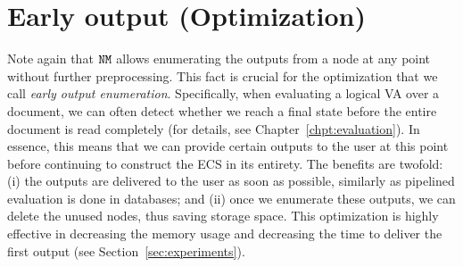 \section{Early output (Optimization)} 

Note again that $\mathtt{NM}$ allows enumerating the outputs from a node at any point without further preprocessing. This fact is crucial for the optimization that we call \emph{early output enumeration}. Specifically, when evaluating a logical VA over a document, we can often detect whether we reach a final state before the entire document is read completely (for details, see Chapter~\ref{chpt:evaluation}). In essence, this means that we can provide certain outputs to the user at this point before continuing to construct the ECS in its entirety. The benefits are twofold: (i) the outputs are delivered to the user as soon as possible, similarly as pipelined evaluation is done in databases; and (ii) once we enumerate these outputs, we can delete the unused nodes, thus saving storage space. This optimization is highly effective in decreasing the memory usage and decreasing the time to deliver the first output (see Section~\ref{sec:experiments}). %




%
%



